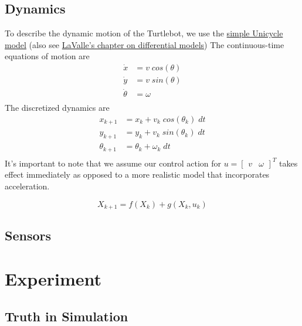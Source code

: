 \documentclass{article}
\begin{document}
\subsection{Dynamics}
To describe the dynamic motion of the Turtlebot, we use the \href{http://faculty.salina.k-state.edu/tim/robotics_sg/Control/kinematics/unicycle.html}{simple Unicycle model}
(also see \href{http://planning.cs.uiuc.edu/ch13.pdf}{LaValle's chapter on differential models})
The continuous-time equations of motion are 
\begin{equation}
    \begin{split}
        \dot x & = v \; cos(\theta) \\
        \dot y & = v \; sin(\theta) \\
        \dot \theta & = \omega \\
    \end{split}
\end{equation}
The discretized dynamics are
\begin{equation}
    \begin{split}
        x_{k+1} & = x_k + v_k \; cos(\theta_k) \; dt \\
        y_{k+1} & = y_k + v_k \; sin(\theta_k) \; dt \\
        \theta_{k+1} & = \theta_k + \omega_k \; dt \\
    \end{split}
\end{equation}
It's important to note that we assume our control action for $u = \begin{bmatrix}
    v & \omega
\end{bmatrix}^T$ takes effect immediately as opposed to a more realistic model that incorporates acceleration.

\begin{equation}
    X_{k+1} = f(X_{k}) + g(X_{k}, u_{k})
\end{equation}
\subsection{Sensors}

\section{Experiment}

\subsection{Truth in Simulation}
\end{document}

